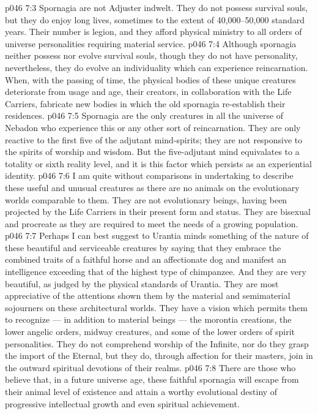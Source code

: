\vs p046 7:3 Spornagia are not Adjuster indwelt. They do not possess survival souls, but they do enjoy long lives, sometimes to the extent of 40,000--50,000 standard years. Their number is legion, and they afford physical ministry to all orders of universe personalities requiring material service.
\vs p046 7:4 \pc Although spornagia neither possess nor evolve survival souls, though they do not have personality, nevertheless, they do evolve an individuality which can experience reincarnation. When, with the passing of time, the physical bodies of these unique creatures deteriorate from usage and age, their creators, in collaboration with the Life Carriers, fabricate new bodies in which the old spornagia re\hyp{}establish their residences.
\vs p046 7:5 Spornagia are the only creatures in all the universe of Nebadon who experience this or any other sort of reincarnation. They are only reactive to the first five of the adjutant mind\hyp{}spirits; they are not responsive to the spirits of worship and wisdom. But the five\hyp{}adjutant mind equivalates to a totality or sixth reality level, and it is this factor which persists as an experiential identity.
\vs p046 7:6 \pc I am quite without comparisons in undertaking to describe these useful and unusual creatures as there are no animals on the evolutionary worlds comparable to them. They are not evolutionary beings, having been projected by the Life Carriers in their present form and status. They are bisexual and procreate as they are required to meet the needs of a growing population.
\vs p046 7:7 Perhaps I can best suggest to Urantia minds something of the nature of these beautiful and serviceable creatures by saying that they embrace the combined traits of a faithful horse and an affectionate dog and manifest an intelligence exceeding that of the highest type of chimpanzee. And they are very beautiful, as judged by the physical standards of Urantia. They are most appreciative of the attentions shown them by the material and semimaterial sojourners on these architectural worlds. They have a vision which permits them to recognize --- in addition to material beings --- the morontia creations, the lower angelic orders, midway creatures, and some of the lower orders of spirit personalities. They do not comprehend worship of the Infinite, nor do they grasp the import of the Eternal, but they do, through affection for their masters, join in the outward spiritual devotions of their realms.
\vs p046 7:8 \pc There are those who believe that, in a future universe age, these faithful spornagia will escape from their animal level of existence and attain a worthy evolutional destiny of progressive intellectual growth and even spiritual achievement.
